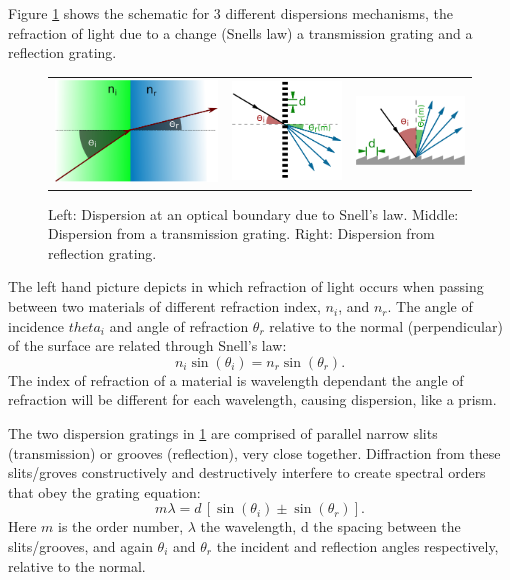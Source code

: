 Figure \cref{fig:dispersion_elements} shows the schematic for 3 different dispersions mechanisms, the refraction of light due to a change (Snells law) a transmission grating and a reflection grating.
\begin{figure}
    \centering
    \begin{tabular}{ccc}
   \includegraphics[width=0.3\linewidth]{figures/spectroscopy/snells_law} & \includegraphics[width=0.2\linewidth]{figures/spectroscopy/dispersion_grism-transmission} & \includegraphics[width=0.3\linewidth]{figures/spectroscopy/dispersion_grism-reflection} \\
\end{tabular}
    \caption[Dispersion mechanisms.]{Left: Dispersion at an optical boundary due to Snell's law.
        Middle: Dispersion from a transmission grating.
        Right: Dispersion from reflection grating.}
    \label{fig:dispersion_elements}
\end{figure}
The left hand picture depicts in which refraction of light occurs when passing between two materials of different refraction index, $n_{i}$, and $n_{r}$.
The angle of incidence $theta_{i}$ and angle of refraction $\theta_{r}$ relative to the normal (perpendicular) of the surface are related through Snell's law:
\[n_{i} \sin(\theta_{i}) = n_{r} \sin(\theta_{r}).\]
The index of refraction of a material is wavelength dependant the angle of refraction will be different for each wavelength, causing dispersion, like a prism.

The two dispersion gratings in \cref{fig:dispersion_elements} are comprised of parallel narrow slits (transmission) or grooves (reflection), very close together.
Diffraction from these slits/groves constructively and destructively interfere to create spectral orders that obey the grating equation:
\begin{equation}
m \lambda = d \, [\sin(\theta_{i}) \pm \sin(\theta_{r})].
\end{equation}
Here $m$ is the order number, $\lambda$ the wavelength, d the spacing between the slits/grooves, and again $\theta_{i}$ and $\theta_{r}$ the incident and reflection angles respectively, relative to the normal.


